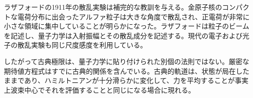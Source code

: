ラザフォードの1911年の散乱実験は補完的な教訓を与える。金原子核のコンパクトな電荷分布に出会ったアルファ粒子は大きな角度で散乱され、正電荷が非常に小さな領域に集中していることが明らかになった。ラザフォードは粒子のビームを記述し、量子力学は入射振幅とその散乱成分を記述する。現代の電子および光子の散乱実験も同じ尺度感度を利用している。

\begin{classroomqa}
\end{classroomqa}

したがって古典極限は、量子力学に貼り付けられた別個の法則ではない。厳密な期待値方程式はすでに古典的関係を含んでいる。古典的軌道は、状態が局在したままであり、ハミルトニアンが十分滑らかに変化して、力を平均することが事実上波束中心でそれを評価することと同じになる場合に現れる。
